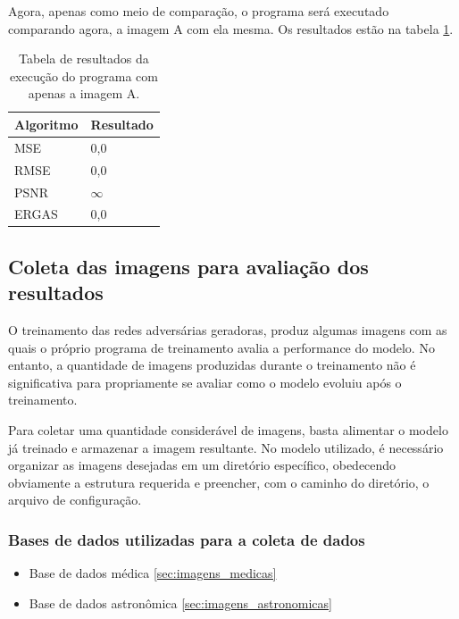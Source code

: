 Agora, apenas como meio de comparação, o programa será executado comparando agora, a imagem A com ela mesma. Os resultados estão na tabela \ref{tab:image_similarity_test_same_image}. 

\begin{table}[H]
    \centering
    \caption{Tabela de resultados da execução do programa com apenas a imagem A.}
    \begin{tabular}{|l|l|} \hline
        \textbf{Algoritmo} & \textbf{Resultado} \\ \hline
        MSE                & 0,0                \\ \hline
        RMSE               & 0,0                \\ \hline
        PSNR               & $\infty$           \\ \hline
        ERGAS              & 0,0                \\ \hline
    \end{tabular}
    \vspace{0.3cm}
    \label{tab:image_similarity_test_same_image}
\end{table}

\subsection{Coleta das imagens para avaliação dos resultados}

O treinamento das redes adversárias geradoras, produz algumas imagens com as quais o próprio programa de treinamento avalia a performance do modelo. No entanto, a quantidade de imagens produzidas durante o treinamento não é significativa para propriamente se avaliar como o modelo evoluiu após o treinamento.

Para coletar uma quantidade considerável de imagens, basta alimentar o modelo já treinado e armazenar a imagem resultante. No modelo utilizado, é necessário organizar as imagens desejadas em um diretório específico, obedecendo obviamente a estrutura requerida e preencher, com o caminho do diretório, o arquivo de configuração.


\subsubsection{Bases de dados utilizadas para a coleta de dados}

\begin{itemize}
    \item Base de dados médica \ref{sec:imagens_medicas}
    \item Base de dados astronômica \ref{sec:imagens_astronomicas}
\end{itemize}

